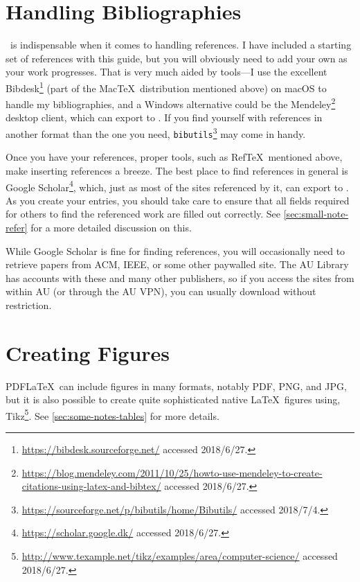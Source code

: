 \section*{Handling Bibliographies}
\label{sec:handl-bibl}

\mBibTeX\ is indispensable when it comes to handling references.
I have included a starting set of references with this guide, but you will obviously need to add your own as your work progresses.  That is very much aided by tools---I use the excellent Bibdesk\footnote{\url{https://bibdesk.sourceforge.net/} accessed   2018/6/27.} (part of the Mac\negthinspace\TeX\ distribution mentioned above) on macOS to handle my bibliographies, and a Windows alternative could be the Mendeley\footnote{\url{https://blog.mendeley.com/2011/10/25/howto-use-mendeley-to-create-citations-using-latex-and-bibtex/}   accessed 2018/6/27.}  desktop client, which can export to \mBibTeX.
If you find yourself with references in another format than the one you need, \texttt{bibutils}\footnote{\url{https://sourceforge.net/p/bibutils/home/Bibutils/}   accessed 2018/7/4.} may come in handy.

Once you have your references, proper tools, such as Ref\TeX\ mentioned above, make inserting references a breeze.
The best place to find references in general is Google Scholar\footnote{\url{https://scholar.google.dk/} accessed 2018/6/27.}, which, just as most of the sites referenced by it, can export to \mBibTeX.
As you create your entries, you should take care to ensure that all fields required for others to find the referenced work are filled out correctly.
See \autoref{sec:small-note-refer} for a more detailed discussion on this.

While Google Scholar is fine for finding references, you will occasionally need to retrieve papers from ACM, IEEE, or some other paywalled site.
The AU Library has accounts with these and many other publishers, so if you access the sites from within AU (or through the AU VPN), you can usually download without restriction.

\section*{Creating Figures}
\label{sec:creating-figures}

PDF\LaTeX\ can include figures in many formats, notably \acs{PDF}, \acs{PNG}, and \acs{JPG}, but it is also possible to create quite sophisticated native \LaTeX\ figures using, \eg Tikz\footnote{\url{http://www.texample.net/tikz/examples/area/computer-science/} accessed 2018/6/27.}. See \autoref{sec:some-notes-tables} for more details.

